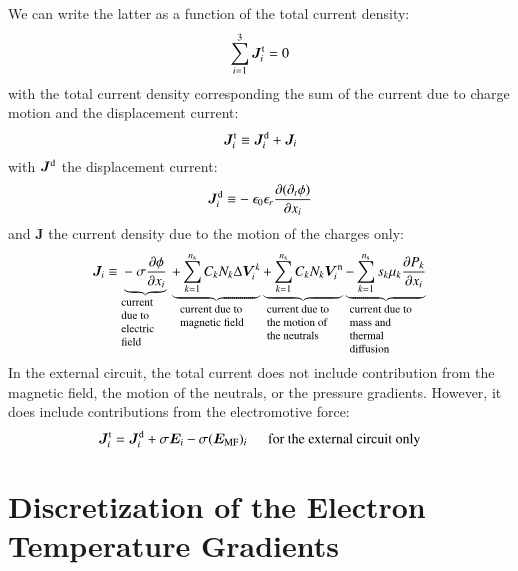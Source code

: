\documentclass{warpdoc}
\newcommand{\ns}{{n_{\rm s}}}
\renewcommand{\vec}[1]{\bm{#1}}
\begin{document}
%
We can write the latter as a function of the total current density:
%
\begin{equation}
\sum_{i=1}^3 \vec{J}_i^{\rm t} =0
\end{equation}
%
with the total current density corresponding the sum of the current due to charge motion and the displacement current:
%
\begin{equation}
 \vec{J}_i^{\rm t} \equiv 
  \vec{J}_i^{\rm d}
+\vec{J}_i
\label{eqn:Jtotal}
\end{equation}
%
with $\vec{J}^{\rm d}$ the displacement current:
%
\begin{equation}
 \vec{J}_i^{\rm d} \equiv 
  -~\epsilon_0 \epsilon_r \frac{\partial (\partial_t \phi)}{\partial x_i}
\label{eqn:Jdisplacement}
\end{equation}
%
and $\vec{J}$ the current density due to the motion of the charges only:
%
\begin{equation}
 \vec{J}_i \equiv 
  \underbrace{-~\sigma\frac{\partial \phi}{\partial x_i}}_{\begin{minipage}{0.1\textwidth}\footnotesize\flushleft current due to electric field \end{minipage}}
\underbrace{+ \sum_{k=1}^\ns C_k N_k \Delta \vec{V}^k_i}_{\begin{minipage}{0.15\textwidth}\footnotesize\flushleft current due to magnetic field \end{minipage}}
\underbrace{+ \sum_{k=1}^\ns C_k N_k \vec{V}^{\rm n}_i}_{\begin{minipage}{0.15\textwidth}\footnotesize\flushleft current due to the motion of the neutrals \end{minipage}}
\underbrace{- \sum_{k=1}^\ns {s_k \mu_k} \frac{\partial P_k}{\partial x_i} }_{\begin{minipage}{0.15\textwidth}\footnotesize\flushleft current due to mass and thermal diffusion \end{minipage}}
\label{eqn:Jcomponents}
\end{equation}
%
In the external circuit, the total current does not include contribution from the magnetic field, the motion of the neutrals, or the pressure gradients. However, it does include  contributions from the electromotive force:
%
\begin{equation}
 \vec{J}_i^{\rm t} =
  \vec{J}_i^{\rm d}
+ \sigma \vec{E}_i
- \sigma (\vec{E}_{\rm MF})_i ~~~~~~\textrm{for the external circuit only}
\end{equation}
%


\section{Discretization of the Electron Temperature Gradients}
\end{document}
